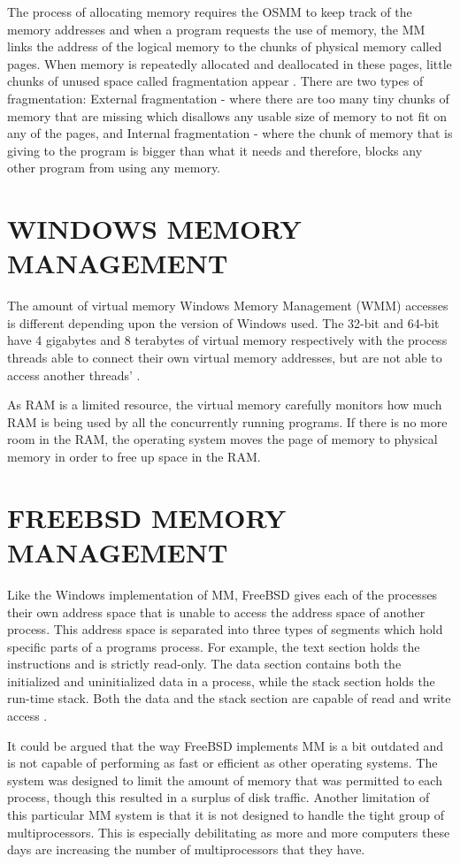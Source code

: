 \documentclass[letterpaper, 10 pt, conference]{ieeeconf}
\begin{document}
The process of allocating memory requires the OSMM to keep track of the memory addresses and when a program requests the use of memory, the MM links the address of the logical memory to the chunks of physical memory called pages.  When memory is repeatedly allocated and deallocated in these pages, little chunks of unused space called fragmentation appear \cite{1}. There are two types of fragmentation: External fragmentation - where there are too many tiny chunks of memory that are missing which disallows any usable size of memory to not fit on any of the pages, and Internal fragmentation - where the chunk of memory that is giving to the program is bigger than what it needs and therefore, blocks any other program from using any memory. \par

\section{WINDOWS MEMORY MANAGEMENT}
The amount of virtual memory Windows Memory Management (WMM) accesses is different depending upon the version of Windows used. The 32-bit and 64-bit have 4 gigabytes and 8 terabytes of virtual memory respectively with the process threads able to connect their own virtual memory addresses, but are not able to access another threads' \cite{2}.\par
As RAM is a limited resource, the virtual memory carefully monitors how much RAM is being used by all the concurrently running programs. If there is no more room in the RAM, the operating system moves the page of memory to physical memory in order to free up space in the RAM.  

\section{FREEBSD MEMORY MANAGEMENT}

Like the Windows implementation of MM, FreeBSD gives each of the processes their own address space that is unable to access the address space of another process. This address space is separated into three types of segments which hold specific parts of a programs process. For example, the text section holds the instructions and is strictly read-only. The data section contains both the initialized and uninitialized data in a process, while the stack section holds the run-time stack. Both the data and the stack section are capable of read and write access \cite{3}.\par
It could be argued that the way FreeBSD implements MM is a bit outdated and is not capable of performing as fast or efficient as other operating systems. The system was designed to limit the amount of memory that was permitted to each process, though this resulted in a surplus of disk traffic. Another limitation of this particular MM system is that it is not designed to handle the tight group of multiprocessors. This is especially debilitating as more and more computers these days are increasing the number of multiprocessors that they have.
\end{document}
